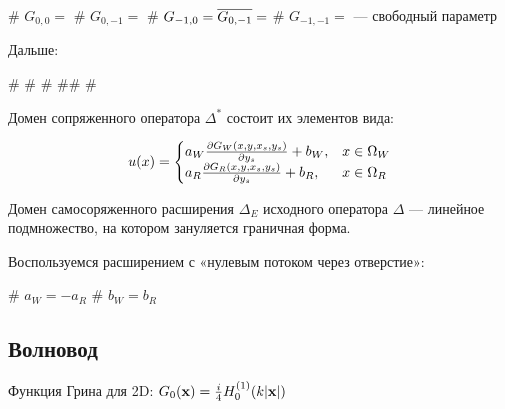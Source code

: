 \begin{ilist}
# $G_{0, 0} = $ 
# $G_{0, -1} = $ 
# $G_{-1, 0} = \overline{G_{0, -1}} = $ 
# $G_{-1, -1} = $ — свободный параметр 
\end{ilist}

Дальше:

\begin{elist}
# 
# 
# 
## 
# 
\end{elist}


Домен сопряженного оператора $\Delta^*$ состоит их элементов вида:

\[
u(x) = \begin{cases}
a_W \pdv{G_W(x, y, x_s, y_s)}{y_s} (x_s = x_0, x_s = y_0) + b_W, & x \in \Omega_W \\
a_R \pdv{G_R(x, y, x_s, y_s)}{y_s} (x_s = x_0, x_s = y_0) + b_R, & x \in \Omega_R \\
\end{cases}
\]

Домен самосоряженного расширения $\Delta_E$ исходного оператора $\Delta$ — линейное подмножество, на котором зануляется граничная форма. 


Воспользуемся расширением с «нулевым потоком через отверстие»:

\begin{ilist}
# $a_W = -a_R$
# $b_W = b_R$
\end{ilist}

\subsection{Волновод}







Функция Грина для 2D: $G_0(\vb{x}) = \frac{i}{4} H_0^{(1)}(k |\vb{x}|)$



